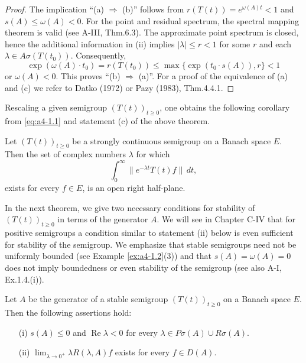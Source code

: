 \begin{proof} The implication ``(a) \( \Rightarrow \) (b)'' follows from \( r(T(t)) = e^{\omega(A) t} < 1 \) and \( s(A) \leq \omega(A) < 0 \). For the point and residual spectrum, the spectral mapping theorem is valid (see A-III, Thm.6.3). The approximate point spectrum is closed, hence the additional information in (ii)
implies \( |\lambda| \leq r < 1 \) for some \( r \) and each \( \lambda \in A\sigma(T(t_0)) \). 
Consequently, 
\[
\exp(\omega(A) \cdot t_0) = r(T(t_0)) \leq \max\{\exp(t_0 \cdot s(A)), r\} < 1
\]
or \( \omega(A) < 0 \). 
This proves \textquotedblleft (b) \(\Rightarrow\) (a)\textquotedblright. 
For a proof of the equivalence of (a) and (c) we refer to Datko (1972) or Pazy (1983), Thm.4.4.1. 
\end{proof}

\medskip

\noindent
Rescaling a given semigroup \( (T(t))_{t \geq 0} \), one obtains the following corollary from \eqref{eq:a4-1.1} and statement (c) of the above theorem.

\medskip

\begin{corollary} \label{cor:a4-1.12} Let \( (T(t))_{t \geq 0} \) be a strongly continuous semigroup on a Banach space \( E \). Then the set of complex numbers \( \lambda \) for which
\[
\int_{0}^{\infty} \|e^{-\lambda t} T (t) f \| \, dt,
\]
exists for every \( f \in E \), is an open right half-plane.
\end{corollary}
\medskip

\noindent
In the next theorem, we give two necessary conditions for stability of \( (T(t))_{t \geq 0} \) in terms of the generator \( A \). We will see in Chapter C-IV that for positive semigroups a condition similar to statement (ii) below is even sufficient for stability of the semigroup. We emphasize that stable semigroups need not be uniformly bounded (see Example \ref{ex:a4-1.2}(3)) and that \( s(A) = \omega(A) = 0 \) does not imply boundedness or even stability of the semigroup (see also A-I, Ex.1.4.(i)).

\begin{theorem} \label{thm:a4-1.13} Let \( A \) be the generator of a stable semigroup \( (T(t))_{t \geq 0} \) on a Banach space \( E \). Then the following assertions hold:

\begin{itemize}
    \item[(i)] \( s(A) \leq 0 \) and \( \operatorname{Re} \lambda < 0 \) for every \( \lambda \in P\sigma (A) \cup R\sigma(A) \).
    \item[(ii)] \( \lim_{\lambda \to 0^+} \lambda R(\lambda, A) f \) exists for every \( f \in D(A) \).
\end{itemize}
\end{theorem}
\medskip

